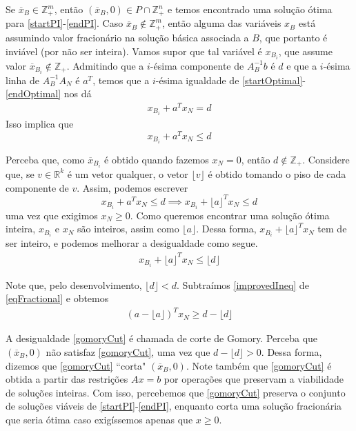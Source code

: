 \documentclass[]{article}
\numberwithin{equation}{section}
\begin{document}
Se $\overline{x}_B \in \mathbb{Z}_+^m$, então $(\overline{x}_B, 0) \in P \cap \mathbb{Z}_+^n$ e temos
encontrado uma solução ótima para \eqref{startPI}-\eqref{endPI}.
Caso $\overline{x}_B \notin \mathbb{Z}_+^m$, então alguma das variáveis $x_B$ está assumindo valor
fracionário na solução básica associada a $B$, que portanto é inviável (por não ser inteira).
Vamos supor que tal variável é $x_{B_i}$, que assume valor $\overline{x}_{B_i} \notin \mathbb{Z}_+$.
Admitindo que a $i$-ésima componente de $A_B^{-1}b$ é $d$ e que a $i$-ésima linha de
$A_B^{-1}A_N$ é $a^T$, temos que a $i$-ésima igualdade de \eqref{startOptimal}-\eqref{endOptimal} nos dá
\begin{align}
x_{B_i} + a^Tx_N = d \label{eqFractional}
\end{align}
Isso implica que
$$
x_{B_i} + a^Tx_N \leq d
$$

Perceba que, como $\overline{x}_{B_i}$ é obtido quando fazemos $x_N = 0$, então $d \notin \mathbb{Z}_+$.
Considere que, se $v \in \mathbb{R}^k$ é um vetor qualquer, o vetor $\lfloor v \rfloor$ é obtido tomando
o piso de cada componente de $v$. Assim, podemos escrever
$$
x_{B_i} + a^Tx_N \leq d \implies x_{B_i} + \lfloor a \rfloor^Tx_N \leq d
$$
uma vez que exigimos $x_N \geq 0$.
Como queremos encontrar uma solução ótima inteira, $x_{B_i}$ e $x_N$ são inteiros, assim como
$\lfloor a \rfloor$.
Dessa forma, $x_{B_i} + \lfloor a \rfloor^Tx_N$ tem de ser inteiro, e podemos melhorar a desigualdade
como segue.
\begin{align}
x_{B_i} + \lfloor a \rfloor^Tx_N \leq \lfloor d \rfloor \label{improvedIneq}
\end{align}

Note que, pelo desenvolvimento, $\lfloor d \rfloor < d$.
Subtraímos \eqref{improvedIneq} de \eqref{eqFractional} e obtemos
\begin{align}
(a - \lfloor a \rfloor)^Tx_N \geq d - \lfloor d \rfloor \label{gomoryCut}
\end{align}

A desigualdade \eqref{gomoryCut} é chamada de corte de Gomory.
Perceba que $(\overline{x}_B, 0)$ não satisfaz \eqref{gomoryCut}, uma vez que
$d - \lfloor d \rfloor > 0$.
Dessa forma, dizemos que \eqref{gomoryCut} ``corta" $(\overline{x}_B, 0)$.
Note também que \eqref{gomoryCut} é obtida a partir das restrições $Ax = b$ por operações que preservam
a viabilidade de soluções inteiras.
Com isso, percebemos que \eqref{gomoryCut} preserva o conjunto de soluções viáveis de
\eqref{startPI}-\eqref{endPI}, enquanto corta uma solução fracionária que seria ótima caso exigíssemos
apenas que $x \geq 0$.
\end{document}
